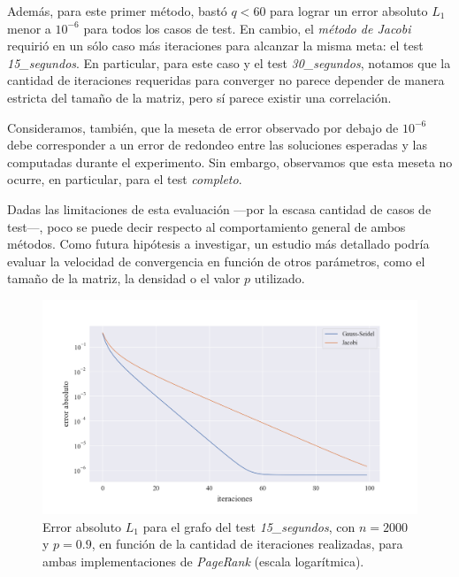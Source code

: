 \vspace{1em}
Además, para este primer método, bastó $q < 60$ para lograr un error absoluto $L_1$ menor a $10^{-6}$ para todos los casos de test. En cambio, el \textit{método de Jacobi} requirió en un sólo caso más iteraciones para alcanzar la misma meta: el test \textit{15\_segundos}. En particular, para este caso y el test \textit{30\_segundos}, notamos que la cantidad de iteraciones requeridas para converger no parece depender de manera estricta del tamaño de la matriz, pero sí parece existir una correlación.

\vspace{1em}
Consideramos, también, que la meseta de error observado por debajo de $10^{-6}$ debe corresponder a un error de redondeo entre las soluciones esperadas y las computadas durante el experimento. Sin embargo, observamos que esta meseta no ocurre, en particular, para el test \textit{completo}.

\vspace{1em}
Dadas las limitaciones de esta evaluación ---por la escasa cantidad de casos de test---, poco se puede decir respecto al comportamiento general de ambos métodos. Como futura hipótesis a investigar, un estudio más detallado podría evaluar la velocidad de convergencia en función de otros parámetros, como el tamaño de la matriz, la densidad o el valor $p$ utilizado. 

\vspace{1em}
\begin{figure}[!htbp]
    \centering
    \includegraphics[width=.9\textwidth]{files/src/.media/convergencia_test_15_segundos.png}
    \caption{Error absoluto $L_1$ para el grafo del test \textit{15\_segundos}, con $n = 2000$ y $p = 0.9$, en función de la cantidad de iteraciones realizadas, para ambas implementaciones de \textit{PageRank} (escala logarítmica).} \label{test_15_segundos}
\end{figure}

